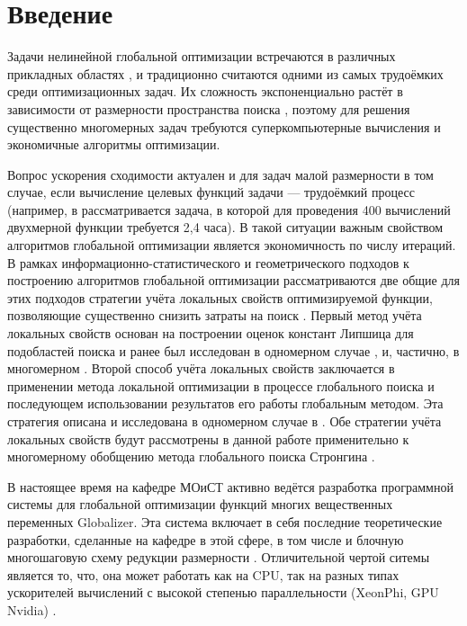 \section{Введение}
Задачи нелинейной глобальной оптимизации встречаются в различных прикладных областях \cite{Kvasov2013, Barkalov2013},
и традиционно считаются одними из самых трудоёмких среди оптимизационных задач.
Их сложность экспоненциально растёт в зависимости от размерности пространства поиска \cite{Vavasis1995},
поэтому для решения существенно многомерных задач требуются суперкомпьютерные вычисления и
экономичные алгоритмы оптимизации.

Вопрос ускорения сходимости актуален и для задач малой размерности в том случае, если вычисление
целевых функций задачи --- трудоёмкий процесс (например, в \cite{Barkalov2013} рассматривается
задача, в которой для проведения 400 вычислений двухмерной функции требуется 2,4 часа).
В такой ситуации важным свойством алгоритмов глобальной оптимизации является экономичность по
числу итераций. В рамках информационно-статистического \cite{strOptBook} и геометрического подходов \cite{piyavskij1972} к
построению алгоритмов глобальной оптимизации рассматриваются две общие для этих подходов
стратегии учёта локальных свойств оптимизируемой функции, позволяющие существенно
снизить затраты на поиск \cite{sergLocalTuning}. Первый метод учёта локальных свойств
основан на построении оценок констант Липшица для подобластей поиска и ранее был
исследован в одномерном случае \cite{sergLocalTuning,nestedLocal}, и, частично, в многомерном \cite{strongSerg}.
Второй способ учёта локальных свойств заключается в применении метода локальной оптимизации в процессе глобального
поиска и последующем использовании результатов его работы глобальным методом. Эта стратегия
описана и исследована в одномерном случае в \cite{sergLocalTuning}. Обе стратегии
учёта локальных свойств будут рассмотрены в данной работе применительно к многомерному
обобщению метода глобального поиска Стронгина \cite{strOptBook}.

В настоящее время на кафедре МОиСТ активно ведётся разработка программной системы
для глобальной оптимизации функций многих вещественных переменных Globalizer.
Эта система включает в себя последние теоретические разработки, сделанные на кафедре в
этой сфере, в том числе и блочную многошаговую схему редукции размерности \cite{blockNested}.
Отличительной чертой ситемы является то, что, она может работать как на CPU, так на
разных типах ускорителей вычислений с высокой степенью параллельности (XeonPhi, GPU Nvidia) \cite{examinArtcle, examinPhiArtcle}.

